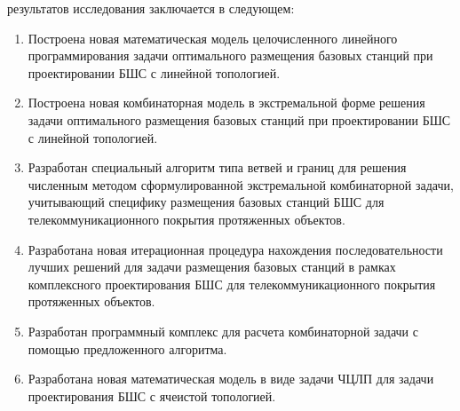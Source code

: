  

{\novelty} результатов исследования заключается в следующем:
\begin{enumerate}[beginpenalty=10000] %

    \item Построена новая математическая модель целочисленного линейного программирования задачи оптимального размещения базовых станций при проектировании БШС с линейной топологией. 
    \item Построена новая комбинаторная модель в экстремальной форме решения задачи оптимального размещения базовых станций при проектировании БШС с линейной топологией.   
    \item Разработан специальный алгоритм типа ветвей и границ для решения численным методом сформулированной экстремальной комбинаторной задачи, учитывающий специфику размещения базовых станций БШС для телекоммуникационного покрытия протяженных объектов.
    \item  Разработана новая итерационная процедура нахождения последовательности лучших решений для задачи размещения базовых станций в рамках комплексного проектирования БШС для телекоммуникационного покрытия протяженных объектов.
    \item Разработан программный комплекс для расчета комбинаторной задачи с помощью предложенного алгоритма.
    \item Разработана новая математическая модель в виде задачи ЧЦЛП для задачи проектирования БШС с ячеистой топологией.

    

\end{enumerate}

